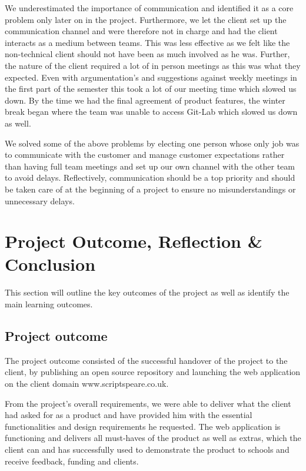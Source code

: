 \documentclass{l3proj}
\begin{document}
We underestimated the importance of communication and identified it as a core problem only later on in the project. Furthermore, we let the client set up the communication channel and were therefore not in charge and had the client interacts as a medium between teams. This was less effective as we felt like the non-technical client should not have been as much involved as he was. Further, the nature of the client required a lot of in person meetings as this was what they expected. Even with argumentation's and suggestions against weekly meetings in the first part of the semester this took a lot of our meeting time which slowed us down. By the time we had the final agreement of product features, the winter break began where the team was unable to access Git-Lab which slowed us down as well.

We solved some of the above problems by electing one person whose only job was to communicate with the customer and manage customer expectations rather than having full team meetings and set up our own channel with the other team to avoid delays. Reflectively, communication should be a top priority and should be taken care of at the beginning of a project to ensure no misunderstandings or unnecessary delays.




\section{Project Outcome, Reflection \& Conclusion}

This section will outline the key outcomes of the project as well as identify the main learning outcomes.

\subsection{Project outcome}
The project outcome consisted of the successful handover of the project to the client, by publishing an open source repository and launching the web application on the client domain www.scriptspeare.co.uk. 

From the project’s overall requirements, we were able to deliver what the client had asked for as a product and have provided him with the essential functionalities and design requirements he requested. The web application is functioning and delivers all must-haves of the product as well as extras, which the client can and has successfully used to demonstrate the product to schools and receive feedback, funding and clients. 
\end{document}
